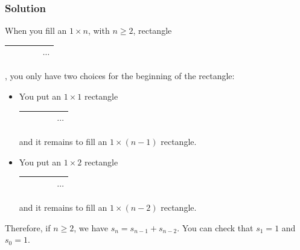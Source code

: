\documentclass{beamer}
\begin{document}

\begin{frame}%
\frametitle{Solution}


When you fill an $1\times n$, with $n\ge 2$, rectangle
\begin{tabular}{|c:c:c:c:c}
\hline
& & & & $\cdots$ \\
\hline
\end{tabular}
, you only have two choices for the beginning of the rectangle:\\

\vspace{0.3cm}

\begin{itemize}

\item<2-> You put an $1\times 1$ rectangle \begin{tabular}{|c|c:c:c:c}
\hline
& & & & $\cdots$ \\
\hline
\end{tabular} and it remains to fill an $1\times (n-1)$ rectangle.\\

\vspace{0.5cm}

\item<3-> You put an $1\times2$ rectangle \begin{tabular}{|cc|c:c:c}
\hline
& & & & $\cdots$ \\
\hline
\end{tabular} and it remains to fill an $1\times (n-2)$ rectangle.\\

\end{itemize}
\vspace{0.5cm}

Therefore, if $n\ge 2$, we have $s_n = s_{n-1} + s_{n-2}$. You can check that $s_1 = 1$ and $s_0 = 1$.

\end{frame}
\end{document}
